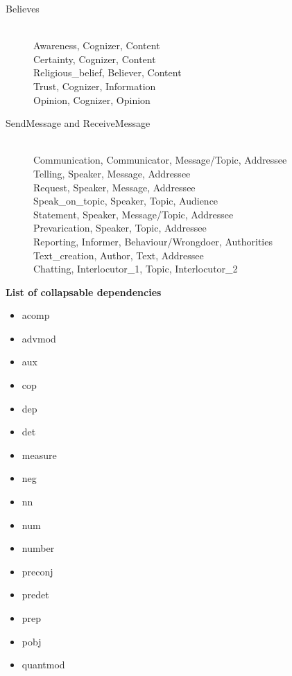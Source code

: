 \begin{description}
\item[Believes] \hfill \\ 
Awareness, Cognizer, Content \hfill \\ 
Certainty, Cognizer, Content \hfill \\ 
Religious_belief, Believer, Content \hfill \\ 
Trust, Cognizer, Information \hfill \\ 
Opinion, Cognizer, Opinion \hfill \\ 

\item[SendMessage and ReceiveMessage] \hfill \\ 
Communication, Communicator, Message/Topic, Addressee \hfill \\ 
Telling, Speaker, Message, Addressee \hfill \\ 
Request, Speaker, Message, Addressee \hfill \\ 
Speak_on_topic, Speaker, Topic, Audience \hfill \\ 
Statement, Speaker, Message/Topic, Addressee \hfill \\ 
Prevarication, Speaker, Topic, Addressee \hfill \\ 
Reporting, Informer, Behaviour/Wrongdoer, Authorities \hfill \\ 
Text_creation, Author, Text, Addressee \hfill \\ 
Chatting, Interlocutor_1, Topic, Interlocutor_2 \hfill \\ 
\end{description}

\textbf{List of collapsable dependencies}

\begin{itemize}
\item{acomp}
\item{advmod}
\item{aux}
\item{cop}
\item{dep}
\item{det}
\item{measure}
\item{neg}
\item{nn}
\item{num}
\item{number}
\item{preconj}
\item{predet}
\item{prep}
\item{pobj}
\item{quantmod}
\end{itemize}


